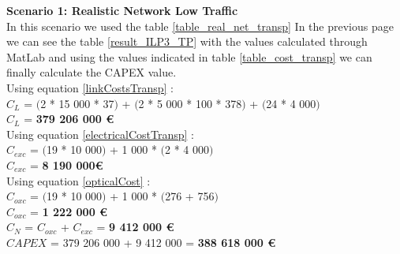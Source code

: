 \textbf{Scenario 1: Realistic Network Low Traffic} \label{Scenario3_transp} \\

In this scenario we used the table \ref{table_real_net_transp} In the previous page we can see the table \ref{result_ILP3_TP} with the values calculated through MatLab and using the values indicated in table \ref{table_cost_transp} we can finally calculate the CAPEX value. \\

Using equation \ref{linkCostsTransp} : \\
$C_L$ = $($2 * 15 000 * 37$)$ + $($2 * 5 000 * 100 * 378$)$ + $($24 * 4 000$)$ \\
$C_L$ = \textbf{379 206 000 \euro} \\

Using equation \ref{electricalCostTransp} : \\
$C_{exc}$ = $($19 * 10 000$)$ + 1 000 * $($2 * 4 000$)$ \\
$C_{exc}$ = \textbf{8 190 000\euro} \\

Using equation \ref{opticalCost} : \\
$C_{oxc}$ = $($19 * 10 000$)$ + 1 000 * $($276 + 756$)$ \\
$C_{oxc}$ = \textbf{1 222 000 \euro} \\
$C_N$ = $C_{oxc}$ + $C_{exc}$ = \textbf{9 412 000 \euro} \\

$CAPEX$ = 379 206 000 + 9 412 000 = \textbf{388 618 000 \euro}\\

